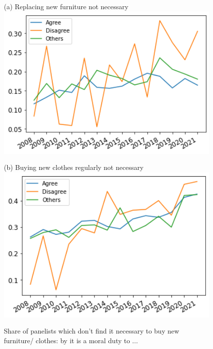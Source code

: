 \documentclass[12pt]{article}
\begin{document}
\begin{figure}[h!!]
	\centering	
	\caption{Share of panelists which don't find it necessary to buy new furniture/ clothes: by it is a moral duty to  ... }\label{fig:evolution_notNecessary_bygroup:moral}	
	\begin{minipage}[h!!]{0.32\textwidth}  
		\centering\footnotesize{(a) Replacing new furniture not necessary}
		\includegraphics[width=1\textwidth]{../codding_data/results/liss/broad_groups_notnecessaryqk20a183_ci307.png}
	\end{minipage}
	\begin{minipage}[h!!]{0.32\textwidth}
		\centering\footnotesize{(b) Buying new clothes regularly not necessary}
		\includegraphics[width=1\textwidth]{../codding_data/results/liss/broad_groups_notnecessaryqk20a183_ci306.png}
	\end{minipage}
\end{figure}
\end{document}
